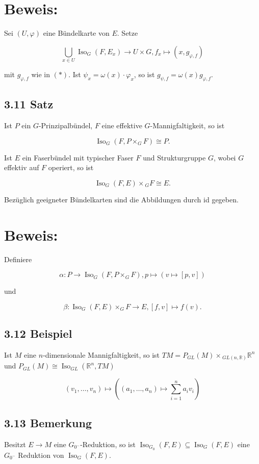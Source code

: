 \section*{Beweis:}
Sei $(U, \varphi)$ eine Bündelkarte von $E$. Setze

$$
\bigcup_{x \in U} \operatorname{Iso}_{G}\left(F, E_{x}\right) \rightarrow U \times G, f_{x} \mapsto\left(x, g_{\varphi, f}\right)
$$

mit $g_{\varphi, f}$ wie in $(*)$. Ist $\psi_{x}=\omega(x) \cdot \varphi_{x}$, so ist $g_{\psi, f}=\omega(x) g_{\varphi, f}$.

\subsection*{3.11 Satz}
Ist $P$ ein $G$-Prinzipalbündel, $F$ eine effektive $G$-Mannigfaltigkeit, so ist

$$
\operatorname{Iso}_{G}\left(F, P \times_{G} F\right) \cong P .
$$

Ist $E$ ein Faserbündel mit typischer Faser $F$ und Strukturgruppe $G$, wobei $G$ effektiv auf $F$ operiert, so ist

$$
\operatorname{Iso}_{G}(F, E) \times{ }_{G} F \cong E .
$$

Bezüglich geeigneter Bündelkarten sind die Abbildungen durch id gegeben.

\section*{Beweis:}
Definiere

$$
\alpha: P \rightarrow \operatorname{Iso}_{G}\left(F, P \times_{G} F\right), p \mapsto(v \mapsto[p, v])
$$

und

$$
\beta: \operatorname{Iso}_{G}(F, E) \times_{G} F \rightarrow E,[f, v] \mapsto f(v) .
$$

\subsection*{3.12 Beispiel}
Ist $M$ eine $n$-dimensionale Mannigfaltigkeit, so ist $T M=P_{G L}(M) \times{ }_{G L(n, \mathbb{R})} \mathbb{R}^{n}$ und $P_{G L}(M) \cong \operatorname{Iso}_{G L}\left(\mathbb{R}^{n}, T M\right)$

$$
\left(v_{1}, \ldots, v_{n}\right) \mapsto\left(\left(a_{1}, \ldots, a_{n}\right) \mapsto \sum_{i=1}^{n} a_{i} v_{i}\right)
$$

\subsection*{3.13 Bemerkung}
Besitzt $E \rightarrow M$ eine $G_{0^{-}}$-Reduktion, so ist $\operatorname{Iso}_{G_{0}}(F, E) \subseteq \operatorname{Iso}_{G}(F, E)$ eine $G_{0^{-}}$ Reduktion von $\operatorname{Iso}_{G}(F, E)$.

